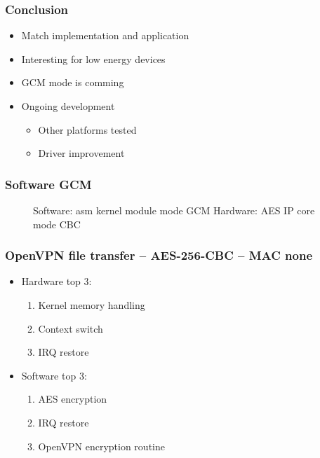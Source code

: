 \documentclass[xcolor={x11names, rgb, usenames, dvipsnames}]{beamer}
\begin{document}
\begin{frame}
\frametitle{Conclusion}
\begin{itemize}
\setlength\itemsep{1em}
	\item Match implementation and application
	\item Interesting for low energy devices
	\item GCM mode is comming
	\item Ongoing development
	\begin{itemize}
		\item Other platforms tested
		\item Driver improvement
	\end{itemize}
\end{itemize}

\end{frame}






\begin{frame}[noframenumbering]
\frametitle{Software GCM}
	\begin{figure}
	
	\caption{Software: asm kernel module mode GCM\newline{} Hardware: AES IP core mode CBC}
	\end{figure}
\end{frame}

\begin{frame}[noframenumbering]
\frametitle{OpenVPN file transfer -- AES-256-CBC -- MAC none}
	\begin{itemize}
		\item Hardware top 3:
		\begin{enumerate}
			\item Kernel memory handling
			\item Context switch
			\item IRQ restore
		\end{enumerate}
		\item Software top 3:
		\begin{enumerate}
			\item AES encryption
			\item IRQ restore
			\item OpenVPN encryption routine
		\end{enumerate}
	\end{itemize}
\end{frame}
\end{document}
